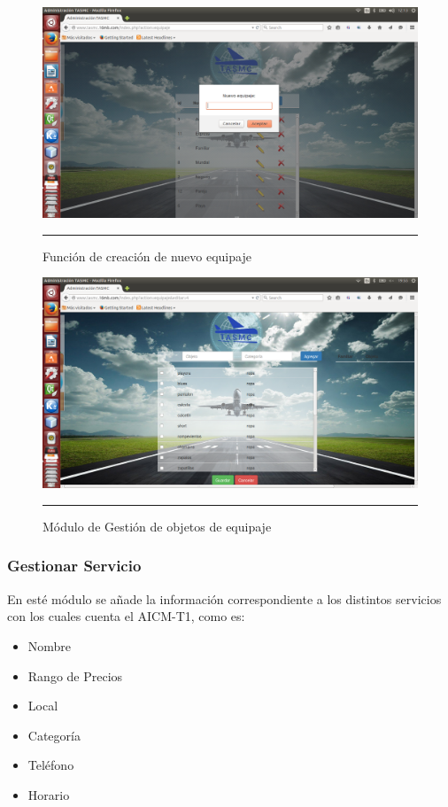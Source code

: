 \begin{figure}[h!]
	\centering
		\includegraphics[width=1\textwidth]{Figuras/nuevoequipajewb.png}
		\rule{35em}{0.5pt}
	\caption[Función de creación de nuevo equipaje]{Función de creación de nuevo equipaje}
	\label{fig:funcionNuevoEquipaje}
\end{figure}

\begin{figure}[h!]
	\centering
		\includegraphics[width=1\textwidth]{Figuras/objetosEquipaje.png}
		\rule{35em}{0.5pt}
	\caption[Módulo de Gestión de objetos de equipaje]{Módulo de Gestión de objetos de equipaje}
	\label{fig:moduloObjetos}
\end{figure}
\clearpage

\subsubsection{Gestionar Servicio}
En esté módulo se añade la información correspondiente a los distintos servicios con los cuales cuenta el AICM-T1, como es: 
\begin{itemize}
 \item Nombre
 \item Rango de Precios
 \item Local
 \item Categoría
 \item Teléfono
 \item Horario
\end{itemize}

